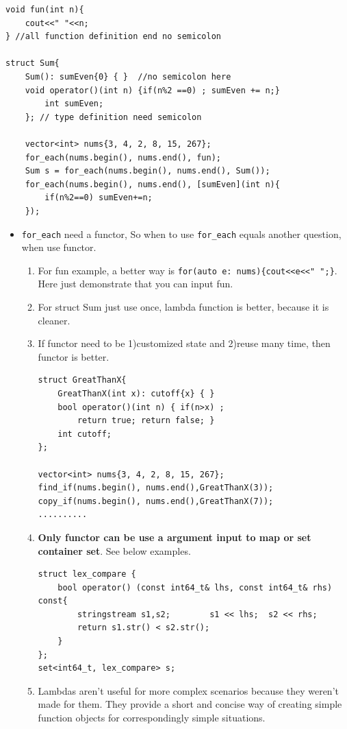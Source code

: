 \documentclass[a4paper,11pt,twoside]{book}
\begin{document}
\begin{lstlisting}[numbers=none]
void fun(int n){
	cout<<" "<<n;
} //all function definition end no semicolon

struct Sum{
	Sum(): sumEven{0} { }  //no semicolon here
	void operator()(int n) {if(n%2 ==0) ; sumEven += n;}
		int sumEven;
	}; // type definition need semicolon
	
	vector<int> nums{3, 4, 2, 8, 15, 267};
	for_each(nums.begin(), nums.end(), fun);
	Sum s = for_each(nums.begin(), nums.end(), Sum());
	for_each(nums.begin(), nums.end(), [sumEven](int n){
		if(n%2==0) sumEven+=n;
	});
\end{lstlisting}
	
	\begin{itemize}
		\item \texttt{for\_each} need a functor, So when to use \texttt{for\_each} equals another question, when use functor.
		\begin{enumerate}
			\item For fun example, a better way is \texttt{for(auto e: nums)\{cout<<e<<" ";\}}. Here just demonstrate that  you can input fun.
			
			\item For struct Sum just use once, lambda function is better, because it is cleaner.
			
			\item If functor need to be 1)customized state and 2)reuse many time, then functor is better.
\begin{lstlisting}[numbers=none]
struct GreatThanX{
	GreatThanX(int x): cutoff{x} { } 
	bool operator()(int n) { if(n>x) ; 
		return true; return false; }
	int cutoff;
};

vector<int> nums{3, 4, 2, 8, 15, 267};
find_if(nums.begin(), nums.end(),GreatThanX(3));
copy_if(nums.begin(), nums.end(),GreatThanX(7));
..........
\end{lstlisting}
			\item \textbf{Only functor can be use a argument input to map or set container set}. See below examples.
			
\begin{lstlisting}[numbers=none]
struct lex_compare {
	bool operator() (const int64_t& lhs, const int64_t& rhs) const{
		stringstream s1,s2;        s1 << lhs;  s2 << rhs;
		return s1.str() < s2.str();
	}
};
set<int64_t, lex_compare> s;
\end{lstlisting}
			
			\item Lambdas aren't useful for more complex scenarios because they weren't made for them. They provide a short and concise way of creating simple function objects for correspondingly simple situations.
			

\end{enumerate}
\end{itemize}
\end{document}
